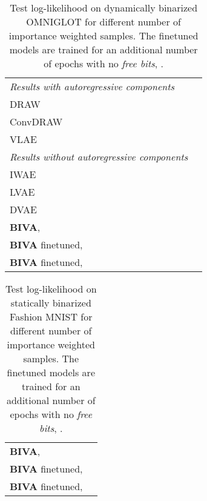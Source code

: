 \documentclass{article}
\def\nm{BIVA\xspace}
\def\abovestrut#1{\rule[0in]{0in}{#1}\ignorespaces}
\def\abovespace{\abovestrut{0.20in}}
\begin{document}
\begin{table}[h!]
\begin{center}
\begin{small}
\begin{sc}
\caption{Test log-likelihood on dynamically binarized OMNIGLOT for different number of importance weighted samples. The finetuned models are trained for an additional number of epochs with no \textit{free bits}, .}\label{table:omniglot}
\begin{tabular}{l c}
 &  \\
\hline
\textit{Results with autoregressive components} \\
DRAW \citep{Gregor15} & \\
ConvDRAW \cite{Gregor16} & \\
VLAE \cite{Chen2017} & \\
\hline
 \textit{Results without autoregressive components} \\
 IWAE \cite{Burda15} & \\
 LVAE \cite{Sonderby2016} & \\
 DVAE \cite{Rolfe2017} & \\
\abovespace
\textbf{\nm},  &  \\
\textbf{\nm} finetuned,  &  \\
\textbf{\nm} finetuned,  &  \\
\hline
\end{tabular}
\end{sc}
\end{small}
\end{center}
\end{table}

\begin{table}[h!]
{\caption{Test log-likelihood on statically binarized Fashion MNIST for different number of importance weighted samples. The finetuned models are trained for an additional number of epochs with no \textit{free bits}, .}\label{table:fashion}}
\begin{center}
\begin{small}
\begin{sc}
\begin{tabular}{l c}
 &  \\
\hline
\textbf{\nm},  &  \\
\textbf{\nm} finetuned,  &  \\
\textbf{\nm} finetuned,  &  \\
\hline
\end{tabular}\end{sc}
\end{small}
\end{center}
\end{table}
\end{document}
